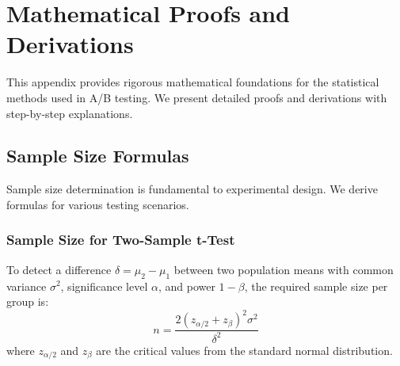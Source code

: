 \appendix
\chapter{Mathematical Proofs and Derivations}

This appendix provides rigorous mathematical foundations for the statistical methods used in A/B testing. We present detailed proofs and derivations with step-by-step explanations.

\section{Sample Size Formulas}

Sample size determination is fundamental to experimental design. We derive formulas for various testing scenarios.

\subsection{Sample Size for Two-Sample t-Test}

\begin{theorem}
To detect a difference $\delta = \mu_2 - \mu_1$ between two population means with common variance $\sigma^2$, significance level $\alpha$, and power $1-\beta$, the required sample size per group is:
\begin{equation}
n = \frac{2(z_{\alpha/2} + z_\beta)^2 \sigma^2}{\delta^2}
\end{equation}
where $z_{\alpha/2}$ and $z_\beta$ are the critical values from the standard normal distribution.
\end{theorem}

